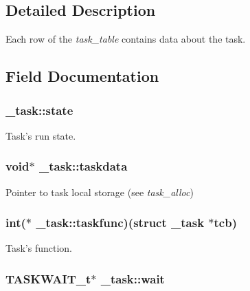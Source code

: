 \subsection{\-Detailed \-Description}
\-Each row of the {\itshape task\-\_\-table\/} contains data about the task. 

\subsection{\-Field \-Documentation}
\hypertarget{struct__task_ae9205de88fa04e3d1647b531510c5850}{
\subsubsection[{state}]{ {\bf \-\_\-task\-::state}}}\label{struct__task_ae9205de88fa04e3d1647b531510c5850}


\-Task's run state. 

\hypertarget{struct__task_a4d013bae5c755de564a24eab1d4f412b}{
\subsubsection[{taskdata}]{\setlength{\rightskip}{0pt plus 5cm}void$\ast$ {\bf \-\_\-task\-::taskdata}}}\label{struct__task_a4d013bae5c755de564a24eab1d4f412b}


\-Pointer to task local storage (see {\itshape task\-\_\-alloc\/}) 

\hypertarget{struct__task_a117951ab1cd1935d3bfe805dcaf5cd7c}{
\subsubsection[{taskfunc}]{\setlength{\rightskip}{0pt plus 5cm}int($\ast$ {\bf \-\_\-task\-::taskfunc})(struct {\bf \-\_\-task} $\ast$tcb)}}\label{struct__task_a117951ab1cd1935d3bfe805dcaf5cd7c}


\-Task's function. 

\hypertarget{struct__task_ad5da6557d0c1af58ee967fee5cf48614}{
\subsubsection[{wait}]{\setlength{\rightskip}{0pt plus 5cm}\-T\-A\-S\-K\-W\-A\-I\-T\-\_\-t$\ast$ {\bf \-\_\-task\-::wait}}}\label{struct__task_ad5da6557d0c1af58ee967fee5cf48614}



